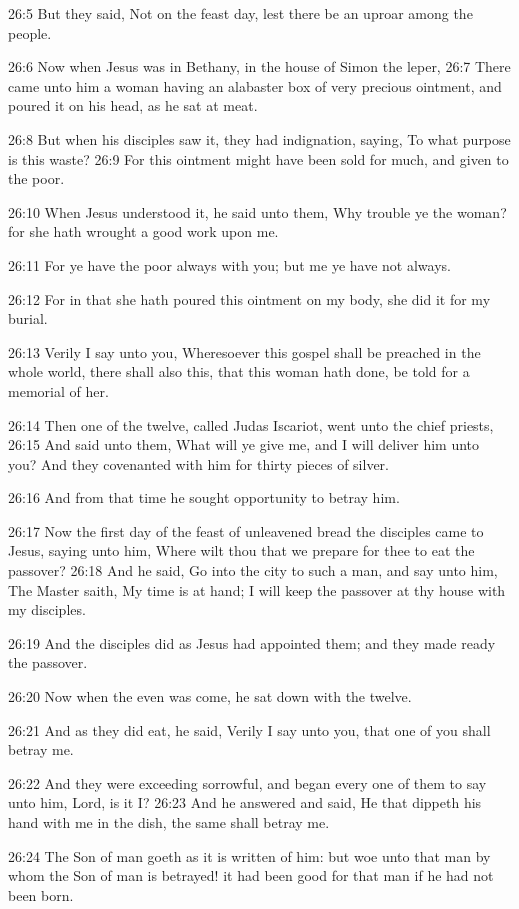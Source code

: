 26:5 But they said, Not on the feast day, lest there be an uproar
among the people.

26:6 Now when Jesus was in Bethany, in the house of Simon the leper,
26:7 There came unto him a woman having an alabaster box of very
precious ointment, and poured it on his head, as he sat at meat.

26:8 But when his disciples saw it, they had indignation, saying, To
what purpose is this waste?  26:9 For this ointment might have been
sold for much, and given to the poor.

26:10 When Jesus understood it, he said unto them, Why trouble ye the
woman? for she hath wrought a good work upon me.

26:11 For ye have the poor always with you; but me ye have not always.

26:12 For in that she hath poured this ointment on my body, she did it
for my burial.

26:13 Verily I say unto you, Wheresoever this gospel shall be preached
in the whole world, there shall also this, that this woman hath done,
be told for a memorial of her.

26:14 Then one of the twelve, called Judas Iscariot, went unto the
chief priests, 26:15 And said unto them, What will ye give me, and I
will deliver him unto you? And they covenanted with him for thirty
pieces of silver.

26:16 And from that time he sought opportunity to betray him.

26:17 Now the first day of the feast of unleavened bread the disciples
came to Jesus, saying unto him, Where wilt thou that we prepare for
thee to eat the passover?  26:18 And he said, Go into the city to such
a man, and say unto him, The Master saith, My time is at hand; I will
keep the passover at thy house with my disciples.

26:19 And the disciples did as Jesus had appointed them; and they made
ready the passover.

26:20 Now when the even was come, he sat down with the twelve.

26:21 And as they did eat, he said, Verily I say unto you, that one of
you shall betray me.

26:22 And they were exceeding sorrowful, and began every one of them
to say unto him, Lord, is it I?  26:23 And he answered and said, He
that dippeth his hand with me in the dish, the same shall betray me.

26:24 The Son of man goeth as it is written of him: but woe unto that
man by whom the Son of man is betrayed! it had been good for that man
if he had not been born.

